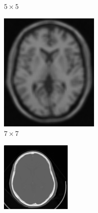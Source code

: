 \documentclass[11pt,twocolumn,twoside]{opticajnl}
\begin{document}
\begin{figure}[h]
\begin{subfigure}[h]{0.24\linewidth}
            \caption{$5\times5$} 
         \end{subfigure}
         \begin{subfigure}[h]{0.24\linewidth}
            \centering
            \includegraphics[width=\textwidth]{Figuras/ImagenA7x7.png}
            \caption{$7\times7$} 
         \end{subfigure}
         \begin{subfigure}[h]{0.24\linewidth}
            \centering
            \includegraphics[width=\textwidth]{Figuras/ImagenC.png}

\end{subfigure}
\end{figure}
\end{document}
